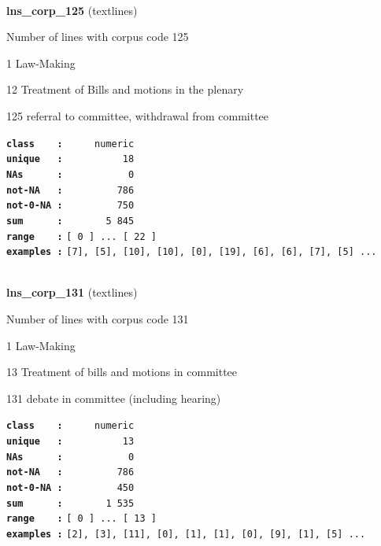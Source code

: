 \documentclass[]{article}
\begin{document}
~

\textbf{lns\_corp\_125} (textlines)

Number of lines with corpus code 125

1 Law-Making

12 Treatment of Bills and motions in the plenary

125 referral to committee, withdrawal from committee

\textbf{\texttt{class\ \ \ \ :}} \texttt{~~~~~numeric}\\
\textbf{\texttt{unique\ \ \ :}} \texttt{~~~~~~~~~~18}\\
\textbf{\texttt{NAs\ \ \ \ \ \ :}} \texttt{~~~~~~~~~~~0}\\
\textbf{\texttt{not-NA\ \ \ :}} \texttt{~~~~~~~~~786}\\
\textbf{\texttt{not-0-NA\ :}} \texttt{~~~~~~~~~750}\\
\textbf{\texttt{sum\ \ \ \ \ \ :}} \texttt{~~~~~~~5~845}\\
\textbf{\texttt{range\ \ \ \ :}}
\texttt{{[}\ 0\ {]}\ ...\ {[}\ 22\ {]}}\\
\textbf{\texttt{examples\ :}}
\texttt{{[}7{]},\ {[}5{]},\ {[}10{]},\ {[}10{]},\ {[}0{]},\ {[}19{]},\ {[}6{]},\ {[}6{]},\ {[}7{]},\ {[}5{]}\ ...}\\

~

\textbf{lns\_corp\_131} (textlines)

Number of lines with corpus code 131

1 Law-Making

13 Treatment of bills and motions in committee

131 debate in committee (including hearing)

\textbf{\texttt{class\ \ \ \ :}} \texttt{~~~~~numeric}\\
\textbf{\texttt{unique\ \ \ :}} \texttt{~~~~~~~~~~13}\\
\textbf{\texttt{NAs\ \ \ \ \ \ :}} \texttt{~~~~~~~~~~~0}\\
\textbf{\texttt{not-NA\ \ \ :}} \texttt{~~~~~~~~~786}\\
\textbf{\texttt{not-0-NA\ :}} \texttt{~~~~~~~~~450}\\
\textbf{\texttt{sum\ \ \ \ \ \ :}} \texttt{~~~~~~~1~535}\\
\textbf{\texttt{range\ \ \ \ :}}
\texttt{{[}\ 0\ {]}\ ...\ {[}\ 13\ {]}}\\
\textbf{\texttt{examples\ :}}
\texttt{{[}2{]},\ {[}3{]},\ {[}11{]},\ {[}0{]},\ {[}1{]},\ {[}1{]},\ {[}0{]},\ {[}9{]},\ {[}1{]},\ {[}5{]}\ ...}\\
\end{document}
